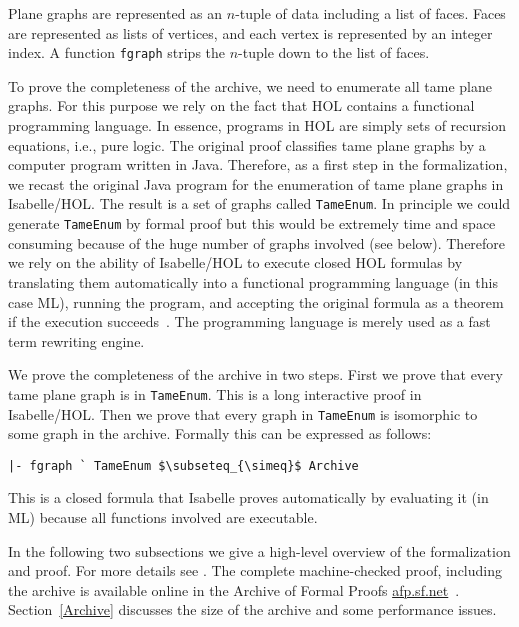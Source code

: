 Plane graphs are represented as an
$n$-tuple of data including a list of faces. Faces are represented
as lists of vertices, and each vertex is represented by an integer index.
A function \verb!fgraph! strips the $n$-tuple down to the list of faces.

To prove the completeness of the archive, we need to enumerate all
tame plane graphs. For this purpose we rely on the fact that HOL
contains a functional programming language. In essence, programs in
HOL are simply sets of recursion equations, i.e., pure logic.  The
original proof classifies tame plane graphs by a computer program
written in Java.  Therefore, as a first step in the formalization, we
recast the original Java program for the enumeration of tame plane graphs in
Isabelle/HOL. The result is a set of graphs called \verb!TameEnum!.  In
principle we could generate \verb!TameEnum! by formal proof but this
would be extremely time and space consuming because of the huge number
of graphs involved (see below). Therefore we rely on the ability of
Isabelle/HOL to execute closed HOL formulas by translating them
automatically into a functional programming language (in this case
ML), running the program, and accepting the original formula as a
theorem if the execution succeeds~\cite{DBLP:conf/flops/HaftmannN10}. The
programming language is merely used as a fast term rewriting engine.

We prove the completeness of the archive in two steps. First
we prove that every tame plane graph is in \verb!TameEnum!.
This is a long interactive proof in Isabelle/HOL.
Then we prove that every graph in \verb!TameEnum! is isomorphic to some
graph in the archive. Formally this can be expressed as follows:

\begin{lstlisting}[keepspaces=true,stringstyle=\tt,basicstyle=\small,%
frame=none,framesep=8pt,mathescape,morekeywords={and,shows},columns=flexible]
|- fgraph ` TameEnum $\subseteq_{\simeq}$ Archive
\end{lstlisting}
This is a closed formula that Isabelle proves automatically by evaluating it
(in ML) because all functions involved are executable.

In the following two subsections we give a high-level overview of the
formalization and proof. For more details see
\cite{NipkowBS-IJCAR06,Nipkow-ITP11}. The complete machine-checked proof,
including the archive is available online in the Archive of Formal Proofs
\url{afp.sf.net}~\cite{BauerN-AFP06}. Section~\ref{Archive} discusses
the size of the archive and some performance issues.

